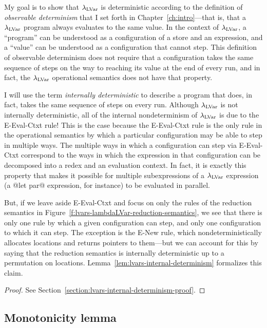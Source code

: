 My goal is to show that $\lambda_{\textrm{LVar}}$ is deterministic according to
the definition of \emph{observable determinism} that I set forth in
Chapter~\ref{ch:intro}---that is, that a $\lambda_{\textrm{LVar}}$ program always
evaluates to the same value.  In the context of $\lambda_{\textrm{LVar}}$, a
``program'' can be understood as a configuration of a store and an
expression, and a ``value'' can be understood as a configuration that
cannot step.  This definition of observable determinism does not
require that a configuration takes the same sequence of steps on the
way to reaching its value at the end of every run, and in fact, the
$\lambda_{\textrm{LVar}}$ operational semantics does not have that property.

I will use the term \emph{internally deterministic} to describe a
program that does, in fact, takes the same sequence of steps on every
run.   Although $\lambda_{\textrm{LVar}}$ is not
internally deterministic, all of the internal nondeterminism of
$\lambda_{\textrm{LVar}}$ is due to the {\sc E-Eval-Ctxt} rule!  This is the case
because the {\sc E-Eval-Ctxt} rule is the only rule in the operational
semantics by which a particular configuration may be able to step in
multiple ways.  The multiple ways in which a configuration can step
via {\sc E-Eval-Ctxt} correspond to the ways in which the expression
in that configuration can be decomposed into a redex and an evaluation
context.  In fact, it is exactly this property that makes it possible
for multiple subexpressions of a $\lambda_{\textrm{LVar}}$ expression (a @let par@
expression, for instance) to be evaluated in parallel.

But, if we leave aside {\sc E-Eval-Ctxt} and focus on only the rules
of the reduction semantics in
Figure~\ref{f:lvars-lambdaLVar-reduction-semantics}, we see that there
is only one rule by which a given configuration can step, and only one
configuration to which it can step.  The exception is the {\sc E-New}
rule, which nondeterministically allocates locations and returns
pointers to them---but we can account for this by saying that the
reduction semantics is internally deterministic up to a permutation on
locations.  Lemma~\ref{lem:lvars-internal-determinism} formalizes this
claim.

\LVarsLemInternalDeterminism
\begin{proof}
  See Section~\ref{section:lvars-internal-determinism-proof}.
\end{proof}

\subsection{Monotonicity lemma}

